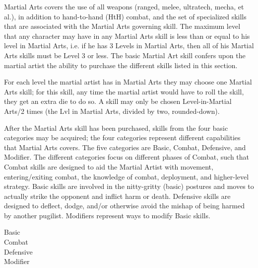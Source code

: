 \documentclass[twoside]{book}
\begin{document}
    {  
    Martial Arts covers the use of all weapons (ranged, melee, ultratech, mecha, et al.), in addition to hand-to-hand (HtH) combat, and the set of specialized skills that are associated with the Martial Arts governing skill. The maximum level that any character may have in any Martial Arts skill is less than or equal to his level in Martial Arts, i.e. if he has 3 Levels in Martial Arts, then all of his Martial Arts skills must be Level 3 or less. The basic Martial Art skill confers upon the martial artist the ability to purchase the different skills listed in this section.
    }
  
    {  
    For each level the martial artist has in Martial Arts they may choose one Martial Arts skill; for this skill, any time the martial artist would have to roll the skill, they get an extra die to do so. A skill may only be chosen Level-in-Martial Arts/2 times (the Lvl in Martial Arts, divided by two, rounded-down).
    }
  
  

  

  
    {  
    After the Martial Arts skill has been purchased, skills from the four basic categories may be acquired; the four categories represent different capabilities that Martial Arts covers. The five categories are Basic, Combat, Defensive, and Modifier. The different categories focus on different phases of Combat, such that Combat skills are designed to aid the Martial Artist with movement, entering/exiting combat, the knowledge of combat, deployment, and higher-level strategy. Basic skills are involved in the nitty-gritty (basic) postures and moves to actually strike the opponent and inflict harm or death. Defensive skills are designed to deflect, dodge, and/or otherwise avoid the mishap of being harmed by another pugilist. Modifiers represent ways to modify Basic skills.
    }
  
\begin{description}
    
  \item[Basic] 
  \item[Combat] 
  \item[Defensive] 
  \item[Modifier] 
\end{description}
  
\end{document}
